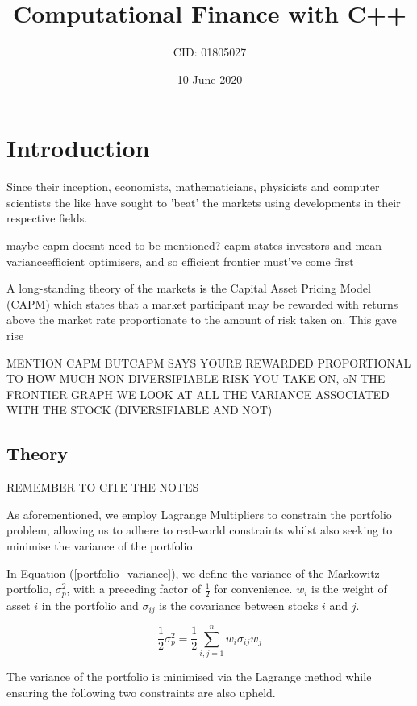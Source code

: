 \documentclass{article}
\title{Computational Finance with C++}
\author{CID: 01805027}
\date{10 June 2020}
\begin{document}
\renewcommand*{\arraystretch}{1.5}

\maketitle
\section{Introduction} 
\label{sec:introduction}

Since their inception, economists, mathematicians, physicists and computer scientists the like have sought to 'beat' the markets using developments in their respective fields.


maybe capm doesnt need to be mentioned? capm states investors and mean varianceefficient optimisers, and so efficient frontier must've come first

A long-standing theory of the markets is the Capital Asset Pricing Model (CAPM) which states that a market participant may be rewarded with returns above the market rate proportionate to the amount of risk taken on. This gave rise 



MENTION CAPM BUTCAPM SAYS YOURE REWARDED PROPORTIONAL TO HOW MUCH NON-DIVERSIFIABLE RISK YOU TAKE ON, oN THE FRONTIER GRAPH WE LOOK AT ALL THE VARIANCE ASSOCIATED WITH THE STOCK (DIVERSIFIABLE AND NOT)



\subsection{Theory}
\label{sec:theory}
REMEMBER TO CITE THE NOTES

As aforementioned, we employ Lagrange Multipliers to constrain the portfolio problem, allowing us to adhere to real-world constraints whilst also seeking to minimise the variance of the portfolio.

In Equation (\ref{portfolio_variance}), we define the variance of the Markowitz portfolio, $\sigma_{p}^{2}$, with a preceding factor of $\frac{1}{2}$ for convenience. $w_i$ is the weight of asset $i$ in the portfolio and $\sigma_{ij}$ is the covariance between stocks $i$ and $j$.

\begin{equation}
\dfrac{1}{2} \sigma^{2}_{p} =  \dfrac{1}{2} \sum_{i,j=1}^{n} w_{i} \sigma_{ij} w_{j}
\label{portfolio_variance}
\end{equation}

The variance of the portfolio is minimised via the Lagrange method while ensuring the following two constraints are also upheld. 
\end{document}
